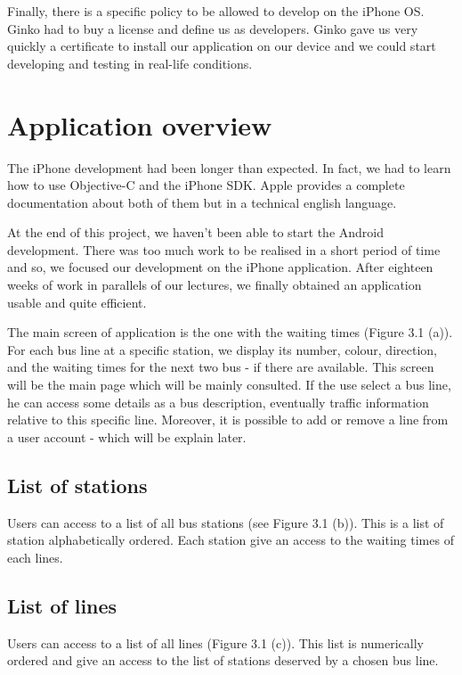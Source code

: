 \documentclass[a4paper, 12pt]{report}
\begin{document}
Finally, there is a specific policy to be allowed to develop on the iPhone OS. Ginko had to buy a license and define us as developers. Ginko gave us very quickly a certificate to install our application on our device and we could start developing and testing in real-life conditions.


\chapter{Application overview}

The iPhone development had been longer than expected. In fact, we had to learn how to use Objective-C and the iPhone SDK. Apple provides a complete documentation about both of them but in a technical english language.

At the end of this project, we haven't been able to start the Android development. There was too much work to be realised in a short period of time and so, we focused our development on the iPhone application. After eighteen weeks of work in parallels of our lectures, we finally obtained an application usable and quite efficient.

The main screen of application is the one with the waiting times (Figure 3.1 (a)). For each bus line at a specific station, we display its number, colour, direction, and the waiting times for the next two bus - if there are available. This screen will be the main page which will be mainly consulted. If the use select a bus line, he can access some details as a bus description, eventually traffic information relative to this specific line. Moreover, it is possible to add or remove a line from a user account - which will be explain later.

\section{List of stations}

Users can access to a list of all bus stations (see Figure 3.1 (b)). This is a list of station alphabetically ordered. Each station give an access to the waiting times of each lines.

\section{List of lines}

Users can access to a list of all lines (Figure 3.1 (c)). This list is numerically ordered and give an access to the list of stations deserved by a chosen bus line.
\end{document}
